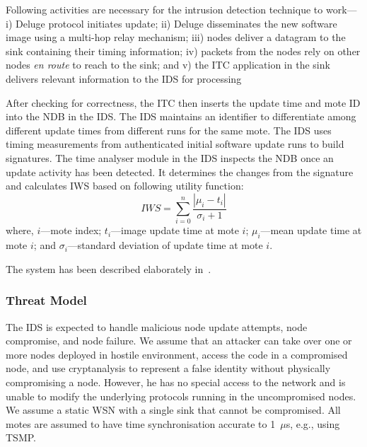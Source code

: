 \documentclass{CRPITStyle}
\renewcommand{\cite}{\citep}
\begin{document}
Following activities are necessary for the intrusion detection technique to work---%
i) Deluge protocol initiates update;
ii) Deluge disseminates the new software image using a multi-hop relay mechanism; 
iii) nodes deliver a datagram to the sink containing their timing information;
iv) packets from the nodes rely on other nodes \emph{en route} to reach to the sink; and
v) the ITC application in the sink delivers relevant information to the IDS for processing 

After checking for correctness, the ITC then inserts the update time and mote ID into the NDB in the IDS.
The IDS maintains an identifier to differentiate among different update times from different runs for the same mote.
The IDS uses timing measurements from authenticated initial software update runs to build signatures.
The time analyser module in the IDS inspects the NDB once an update activity has been detected. 
It determines the changes from the signature and calculates IWS based on following utility function:
\begin{equation}
\label{eqn2} 
	\mathit{IWS} = \sum \limits_{i=0}^{n} \frac{\left| \mu_i - t_i \right|}{\sigma_i + 1}
\end{equation}
where, 
$\mathit{i}$---mote index; %
$\mathit{t_i}$---image update time at mote $\mathit{i}$;  
$\mathit{\mu_i}$---mean update time at mote $\mathit{i}$;  and 
$\mathit{\sigma_i}$---standard deviation of update time at mote $\mathit{i}$. 

The system has been described elaborately in~\cite{aalam15}.

\subsubsection*{Threat Model}
The IDS is expected to handle malicious node update attempts, node compromise, and node failure.
We assume that an  attacker  can take over one or more nodes deployed in hostile environment, access the code in a compromised node, and use cryptanalysis to represent a false identity without physically compromising a node.
However, he has  no special  access to  the  network and is unable to modify the underlying protocols running in the uncompromised nodes.
We assume a static WSN with a single  sink that cannot be compromised. All motes are assumed to have time synchronisation accurate to 1~$\mu$s, e.g., using TSMP. %
\end{document}
